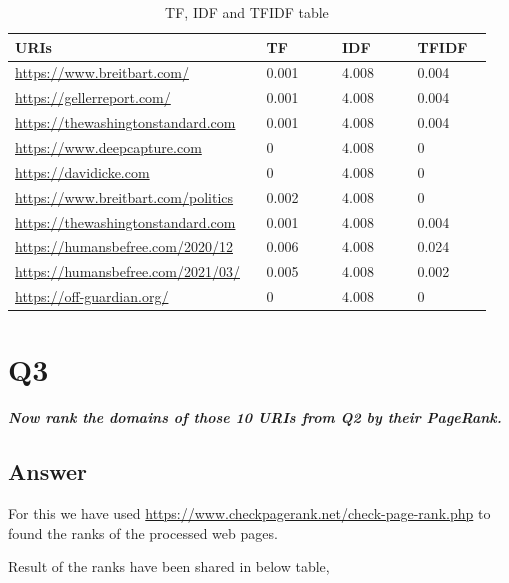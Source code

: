 \documentclass[12pt]{article}
\begin{document}
\begin{table}[h]
\centering
\caption{TF, IDF and TFIDF table}
\label{tbl:simple}
\begin{tabular}{p{0.50\linewidth}p{0.15\linewidth}p{0.15\linewidth}p{0.15\linewidth}}
\hline
\textbf{URIs} & \textbf{TF} & \textbf{IDF} & \textbf{TFIDF} \\ \hline \hline
\url{https://www.breitbart.com/} & 0.001 & 4.008 & 0.004 \\ \hline
\url{https://gellerreport.com/} & 0.001 & 4.008 & 0.004 \\ \hline
\url{https://thewashingtonstandard.com} & 0.001 & 4.008 & 0.004 \\ \hline
\url{https://www.deepcapture.com} & 0 & 4.008 & 0 \\ \hline
\url{https://davidicke.com} & 0 & 4.008 & 0 \\ \hline
\url{https://www.breitbart.com/politics} & 0.002 & 4.008 & 0 \\ \hline
\url{https://thewashingtonstandard.com} & 0.001 & 4.008 & 0.004 \\ \hline
\url{https://humansbefree.com/2020/12} & 0.006 & 4.008 & 0.024 \\ \hline
\url{https://humansbefree.com/2021/03/} & 0.005 & 4.008 & 0.002 \\ \hline
\url{https://off-guardian.org/} & 0 & 4.008 & 0 \\ \hline

\end{tabular}
\end{table}

\clearpage

\section*{Q3}

\emph{ \textbf{Now rank the domains of those 10 URIs from Q2 by their PageRank.}}

\subsection*{Answer}
For this we have used \url{https://www.checkpagerank.net/check-page-rank.php} to found the ranks of the processed web pages.

Result of the ranks have been shared in below table, 
\end{document}
